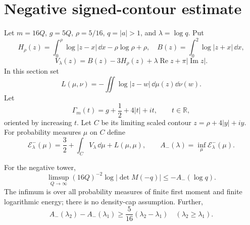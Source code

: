 \section{Negative signed-contour estimate}\label{sec:negative}

Let $m=16Q$, $g=5Q$, $\rho=5/16$, $q=|a|>1$, and $\lambda=\log q$. Put
\[
 H_\rho(z)=\int_0^\rho\log|z-x|\,\dd x-\rho\log\rho+\rho,\quad
 B(z)=\int_0^2\log|z+x|\,\dd x,
\]
\[
 V_\lambda(z)=B(z)-3H_\rho(z)+\lambda\operatorname{Re} z+\pi|\operatorname{Im} z|.
\]
In this section set
\[
 L(\mu,\nu)=-\iint\log|z-w|\,\dd\mu(z)\dd\nu(w).
\]
Let
\[
 \Gamma_m(t)=g+\frac12+4|t|+it,\qquad t\in\mathbb R,
\]
oriented by increasing $t$. Let $C$ be its limiting scaled contour
$z=\rho+4|y|+iy$. For probability measures $\mu$ on $C$ define
\[
 {\mathcal E}^-_\lambda(\mu)=\frac32+\int_CV_\lambda\,\dd\mu
 +L(\mu,\mu),
 \qquad A_-(\lambda)=\inf_\mu{\mathcal E}^-_\lambda(\mu).
\]

\begin{proposition}\label{prop:negative}
For the negative tower,
\begin{equation}
 \limsup_{Q\to\infty}(16Q)^{-2}\log|\det M(-q)|
 \le-A_-(\log q).                                         \label{eq:28}
\end{equation}
The infimum is over all probability measures of finite first moment and
finite logarithmic energy; there is no density-cap assumption. Further,
\begin{equation}
 A_-(\lambda_2)-A_-(\lambda_1)
 \ge\frac5{16}(\lambda_2-\lambda_1)\quad
 (\lambda_2\ge\lambda_1).                                 \label{eq:29}
\end{equation}
\end{proposition}

